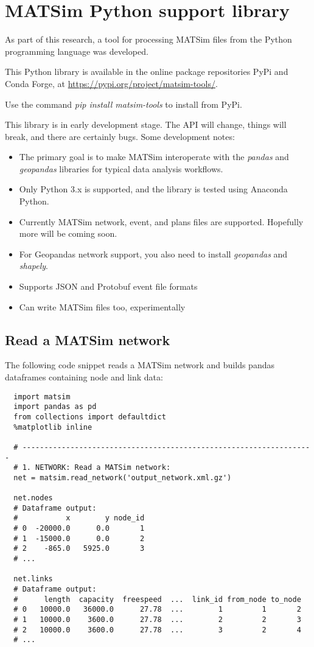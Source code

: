 
\section{MATSim Python support library}
\label{appendix-python}

As part of this research, a tool for processing MATSim files from the Python programming language was developed.

This Python library is available in the online package repositories PyPi and Conda Forge, at \url{https://pypi.org/project/matsim-tools/}.

Use the command \emph{pip install matsim-tools} to install from PyPi.

This library is in early development stage. The API will change, things will break, and there are certainly bugs. Some development notes:

\begin{itemize}
  \tightlist
    \item The primary goal is to make MATSim interoperate with the \emph{pandas} and \emph{geopandas} libraries for typical data analysis workflows.
    \item Only Python 3.x is supported, and the library is tested using Anaconda Python.
    \item Currently MATSim network, event, and plans files are supported. Hopefully more will be coming soon.
    \item For Geopandas network support, you also need to install \emph{geopandas} and \emph{shapely}.
    \item Supports JSON and Protobuf event file formats
    \item Can write MATSim files too, experimentally
  \end{itemize}

\subsection{Read a MATSim network}

The following code snippet reads a MATSim network and builds pandas dataframes containing node and link data:

\begin{lstlisting}
  import matsim
  import pandas as pd
  from collections import defaultdict
  %matplotlib inline

  # -------------------------------------------------------------------
  # 1. NETWORK: Read a MATSim network:
  net = matsim.read_network('output_network.xml.gz')

  net.nodes
  # Dataframe output:
  #           x        y node_id
  # 0  -20000.0      0.0       1
  # 1  -15000.0      0.0       2
  # 2    -865.0   5925.0       3
  # ...

  net.links
  # Dataframe output:
  #      length  capacity  freespeed  ...  link_id from_node to_node
  # 0   10000.0   36000.0      27.78  ...        1         1       2
  # 1   10000.0    3600.0      27.78  ...        2         2       3
  # 2   10000.0    3600.0      27.78  ...        3         2       4
  # ...
\end{lstlisting}

